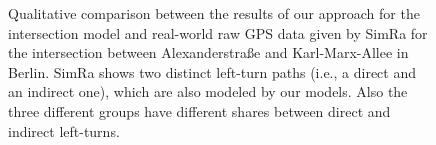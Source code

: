 \begin{figure}[t]
    \centering
    \hfill
    \hfill
    \caption{%
        Qualitative comparison between the results of our approach for the intersection model and real-world raw GPS data given by SimRa for the intersection between Alexanderstraße and Karl-Marx-Allee in Berlin.
        SimRa shows two distinct left-turn paths (i.e., a direct and an indirect one), which are also modeled by our models.
        Also the three different groups have different shares between direct and indirect left-turns.
    }%
    \label{fig:eval_im_traj_new}
\end{figure}

